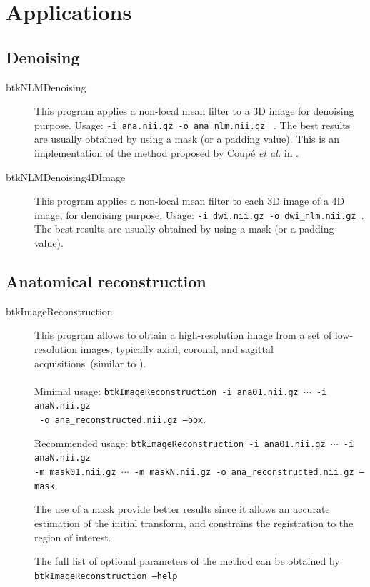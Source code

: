 \section{Applications}

\subsection{Denoising \cite{coupe_2008}}

\begin{description}
 \item[btkNLMDenoising] This program applies a non-local mean filter to a 3D
image  for denoising purpose. Usage: \texttt{-i ana.nii.gz -o ana\_nlm.nii.gz }
. The best results are usually obtained by using a mask
(or a padding value). This is an implementation of the method proposed by Coup\'e \textit{et al.} in \cite{coupe_2008}.
\end{description}

\begin{description}
 \item[btkNLMDenoising4DImage] This program applies a non-local mean filter to 
 each 3D image of a 4D image, for denoising purpose. Usage: \texttt{-i dwi.nii.gz -o dwi\_nlm.nii.gz }. The best results are usually
obtained by using a mask (or a padding value).
\end{description}


\subsection{Anatomical reconstruction}
\label{subsec:ana_rec}

\begin{description}
 \item[btkImageReconstruction] This program allows to obtain a
high-resolution image from a set of low-resolution images, typically
axial, coronal, and sagittal acquisitions~(similar to \cite{rousseau_registration_2006}). \\\\
Minimal usage: \texttt{btkImageReconstruction -i ana01.nii.gz $\cdots$ -i anaN.nii.gz \\\ -o
ana\_reconstructed.nii.gz --box}. 

Recommended usage: \texttt{btkImageReconstruction -i ana01.nii.gz $\cdots$ -i anaN.nii.gz\\
-m mask01.nii.gz $\cdots$ -m maskN.nii.gz -o ana\_reconstructed.nii.gz --mask}. 

The use of a mask provide better results since it allows an accurate estimation of the initial
transform, and constrains the registration to the region of interest.

The full list of optional parameters of the method can be obtained by
\texttt{btkImageReconstruction --help}

\end{description}

